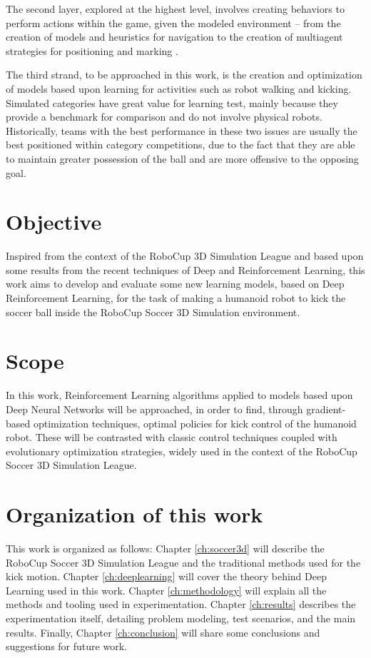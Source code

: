 The second layer, explored at the highest level, involves creating behaviors to perform actions within the game, given the modeled environment -- from the creation of models and heuristics for navigation to the creation of multiagent strategies for positioning and marking \cite{LNAI16-MacAlpine}.

The third strand, to be approached in this work, is the creation and optimization of models based upon learning for activities such as robot walking and kicking. Simulated categories have great value for learning test, mainly because they provide a benchmark for comparison and do not involve physical robots. Historically, teams with the best performance in these two issues are usually the best positioned within category competitions, due to the fact that they are able to maintain greater possession of the ball and are more offensive to the opposing goal.

\section{Objective}

Inspired from the context of the RoboCup 3D Simulation League and based upon some results from the recent techniques of Deep and Reinforcement Learning, this work aims to develop and evaluate some new learning models, based on Deep Reinforcement Learning, for the task of making a humanoid robot to kick the soccer ball inside the RoboCup Soccer 	3D Simulation environment.

\section{Scope}

In this work, Reinforcement Learning algorithms applied to models based upon Deep Neural Networks will be approached, in order to find, through gradient-based optimization techniques, optimal policies for kick control of the humanoid robot. These will be contrasted with classic control techniques coupled with evolutionary optimization strategies, widely used in the context of the RoboCup Soccer 3D Simulation League.

\section{Organization of this work}

This work is organized as follows: Chapter \ref{ch:soccer3d} will describe the RoboCup Soccer 3D Simulation League and the traditional methods used for the kick motion. Chapter \ref{ch:deeplearning} will cover the theory behind Deep Learning used in this work. %
Chapter \ref{ch:methodology} will explain all the methods and tooling used in experimentation. Chapter \ref{ch:results} describes the experimentation itself, detailing problem modeling, test scenarios, and the main results. Finally, Chapter \ref{ch:conclusion} will share some conclusions and suggestions for future work.

